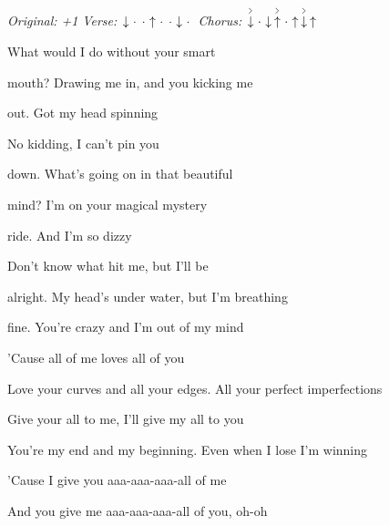\begin{song}


\begin{headerbox}
\RaiseBoxWithAccents
\textit{Original: +1} \quad
\textit{Verse:} $\Down\Miss\Miss\Up\Miss\Miss\Down\Miss$ \quad
\textit{Chorus:} $\AccentDown\Miss\Down\AccentUp\Miss\Up\AccentDown\Up$
\end{headerbox}

\begin{hchordbox}
\end{hchordbox}

\large

\bigskip

\Intro {}     \par

\bigskip

 What would I do without your smart \par
{}mouth? Drawing me in, and you kicking me \par
{}out. Got my head spinning \par
{}No kidding, I can't pin you \par
{}down. What's going on in that beautiful \par
{}mind? I'm on your magical mystery \par
{}ride. And I'm so dizzy \par
Don't know what hit me, but I'll be \par

\bigskip

alright. My head's under water, but I'm breathing \par
{}fine. You're crazy and I'm out of my mind \par

\bigskip

'Cause all of me loves all of you \par
Love your curves and all your edges. All your perfect imperfections \par
Give your all to me, I'll give my all to you \par
You're my end and my beginning. Even when I lose I'm winning \par
'Cause I give you aaa-aaa-aaa-all of me   \par
And you give me aaa-aaa-aaa-all of you, oh-oh \par


\end{song}
